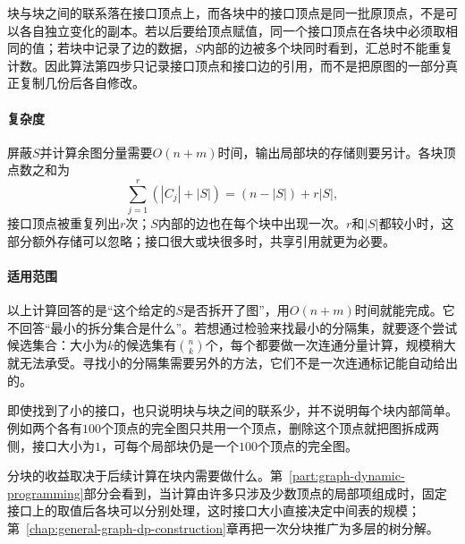 块与块之间的联系落在接口顶点上，而各块中的接口顶点是同一批原顶点，不是可以各自独立变化的副本。若以后要给顶点赋值，同一个接口顶点在各块中必须取相同的值；若块中记录了边的数据，$S$内部的边被多个块同时看到，汇总时不能重复计数。因此算法第四步只记录接口顶点和接口边的引用，而不是把原图的一部分真正复制几份后各自修改。

\paragraph{复杂度}
屏蔽$S$并计算余图分量需要$O(n+m)$时间，输出局部块的存储则要另计。各块顶点数之和为
\[
\sum_{j=1}^{r}(|C_j|+|S|)=(n-|S|)+r|S|,
\]
接口顶点被重复列出$r$次；$S$内部的边也在每个块中出现一次。$r$和$|S|$都较小时，这部分额外存储可以忽略；接口很大或块很多时，共享引用就更为必要。

\paragraph{适用范围}
以上计算回答的是“这个给定的$S$是否拆开了图”，用$O(n+m)$时间就能完成。它不回答“最小的拆分集合是什么”。若想通过检验来找最小的分隔集，就要逐个尝试候选集合：大小为$k$的候选集有$\binom{n}{k}$个，每个都要做一次连通分量计算，规模稍大就无法承受。寻找小的分隔集需要另外的方法，它们不是一次连通标记能自动给出的。

即使找到了小的接口，也只说明块与块之间的联系少，并不说明每个块内部简单。例如两个各有$100$个顶点的完全图只共用一个顶点，删除这个顶点就把图拆成两侧，接口大小为$1$，可每个局部块仍是一个$100$个顶点的完全图。

分块的收益取决于后续计算在块内需要做什么。第~\ref{part:graph-dynamic-programming}部分会看到，当计算由许多只涉及少数顶点的局部项组成时，固定接口上的取值后各块可以分别处理，这时接口大小直接决定中间表的规模；第~\ref{chap:general-graph-dp-construction}章再把一次分块推广为多层的树分解。
